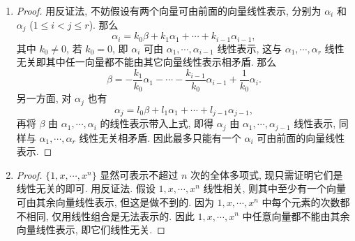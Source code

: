 % 
\begin{enumerate}
    \item %
        \begin{proof}
            用反证法, 不妨假设有两个向量可由前面的向量线性表示, 分别为 $\alpha_i$ 和 $\alpha_j$ ($1 \leq i < j \leq r$). 那么
            \[
                \alpha_i = k_0\beta + k_1\alpha_1 + \cdots + k_{i-1}\alpha_{i-1},    
            \]
            其中 $k_0 \not= 0$, 若 $k_0 = 0$, 即 $\alpha_i$ 可由 $\alpha_1, \cdots, \alpha_{i-1}$ 线性表示,
            这与 $\alpha_1, \cdots, \alpha_r$ 线性无关即其中任一向量都不能由其它向量线性表示相矛盾.
            那么
            \[
                \beta = - \frac{k_1}{k_0}\alpha_1 - \cdots - \frac{k_{i-1}}{k_0}\alpha_{i-1} + \frac{1}{k_0}\alpha_i.
            \]
            另一方面, 对 $\alpha_j$ 也有
            \[
                \alpha_j = l_0\beta + l_1\alpha_1 + \cdots + l_{j-1}\alpha_{j-1},    
            \]
            再将 $\beta$ 由 $\alpha_1, \cdots, \alpha_i$ 的线性表示带入上式, 即得 $\alpha_j$ 由 $\alpha_1, \cdots, \alpha_{j-1}$ 线性表示, 同样与 $\alpha_1, \cdots, \alpha_r$ 线性无关相矛盾.
            因此最多只能有一个 $\alpha_i$ 可由前面的向量线性表示.
        \end{proof}
    \item %
        \begin{proof}
            $\{1, x, \cdots, x^n\}$ 显然可表示不超过 $n$ 次的全体多项式, 现只需证明它们是线性无关的即可.
            用反证法. 假设 $1, x, \cdots, x^n$ 线性相关, 则其中至少有一个向量可由其余向量线性表示, 但这是做不到的.
            因为 $1, x, \cdots, x^n$ 中每个元素的次数都不相同, 仅用线性组合是无法表示的. 因此 $1, x, \cdots, x^n$ 中任意向量都不能由其余向量线性表示, 即它们线性无关.
            

\end{proof}
\end{enumerate}

